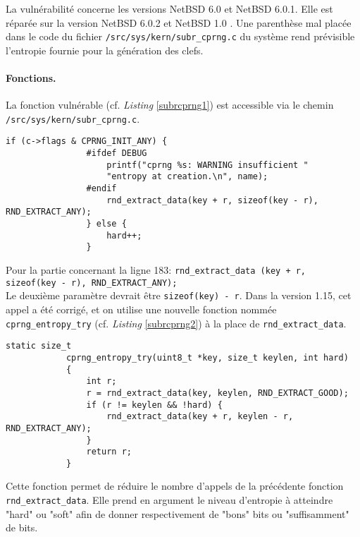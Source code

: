 			La vulnérabilité concerne les versions NetBSD 6.0 et NetBSD 6.0.1. Elle est réparée sur la version NetBSD 6.0.2 et NetBSD 1.0 \cite{diffNetBSD}. Une parenthèse mal placée dans le code du fichier \texttt{/src/sys/kern/subr\_cprng.c} du système rend prévisible l'entropie fournie pour la génération des clefs.\\
			
			\paragraph{Fonctions.\\} 
			
			La fonction vulnérable (cf. \textit{Listing} \ref{subrcprng1}) est accessible via le chemin \texttt{/src/sys/kern/subr\_cprng.c}.
			
			\begin{lstlisting}[style=customc,caption=subr\_cprng.c(1),
			 label=subrcprng1]
				if (c->flags & CPRNG_INIT_ANY) {
				#ifdef DEBUG
					printf("cprng %s: WARNING insufficient "
					"entropy at creation.\n", name);
				#endif
					rnd_extract_data(key + r, sizeof(key - r), RND_EXTRACT_ANY);
				} else {
					hard++;
				}
			\end{lstlisting}
			
			Pour la partie concernant la ligne 183: \texttt{rnd\_extract\_data (key + r, sizeof(key - r), RND\_EXTRACT\_ANY);}\\ 
			Le deuxième paramètre devrait être \texttt{sizeof(key) - r}.	Dans la version 1.15, cet appel a été corrigé, et on utilise une nouvelle fonction nommée \texttt{cprng\_entropy\_try} (cf. \textit{Listing} \ref{subrcprng2}) \cite{diffNetBSD} à la place de \texttt{rnd\_extract\_data}.
			
			\begin{lstlisting}[style=customc,caption=subr\_cprng.c(2), label=subrcprng2]
			static size_t
 	 		cprng_entropy_try(uint8_t *key, size_t keylen, int hard)
 	 		{
 	        	int r;
 	         	r = rnd_extract_data(key, keylen, RND_EXTRACT_GOOD);
 	         	if (r != keylen && !hard) {
 	            	rnd_extract_data(key + r, keylen - r, RND_EXTRACT_ANY);
 	         	}
 	    		return r;
 	    	}
			\end{lstlisting}

			Cette fonction permet de réduire le nombre d'appels de la précédente fonction \texttt{rnd\_extract\_data}. Elle prend en argument le niveau d'entropie à atteindre "hard" ou "soft" afin de donner respectivement de "bons" bits ou "suffisamment" de bits. 

